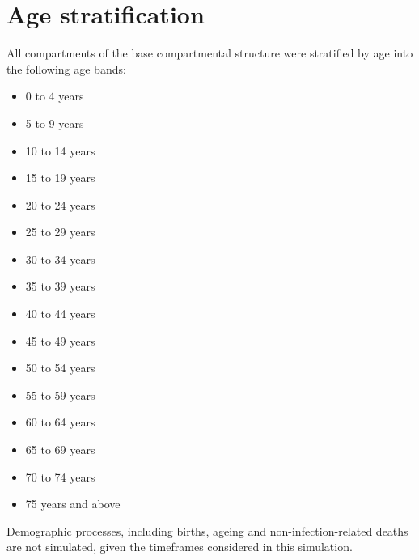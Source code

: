 \section{Age stratification}
All compartments of the base compartmental structure were stratified by age into the following age bands:
\begin{itemize}
    \item 0 to 4 years
    \item 5 to 9 years
    \item 10 to 14 years
    \item 15 to 19 years
    \item 20 to 24 years
    \item 25 to 29 years
    \item 30 to 34 years
    \item 35 to 39 years
    \item 40 to 44 years
    \item 45 to 49 years
    \item 50 to 54 years
    \item 55 to 59 years
    \item 60 to 64 years
    \item 65 to 69 years
    \item 70 to 74 years
    \item 75 years and above
\end{itemize}
Demographic processes, including births, ageing and non-infection-related deaths 
are not simulated, given the timeframes considered in this simulation.
